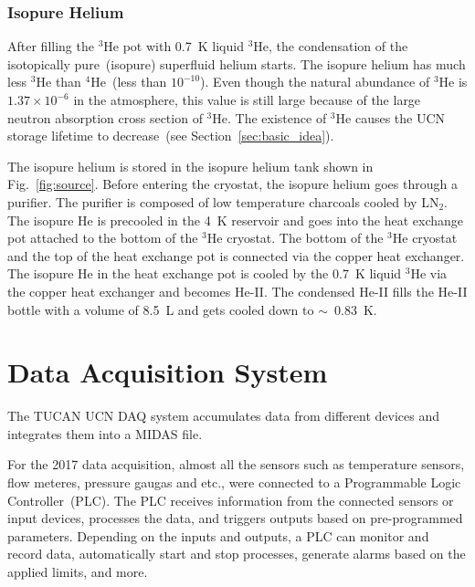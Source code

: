\subsubsection{Isopure Helium}
After filling the $^3$He pot with 0.7~K liquid $^3$He, the
condensation of the isotopically pure~(isopure) superfluid helium
starts. The isopure helium has much less $^3$He than $^4$He~(less than
$10^{-10}$).  Even though the natural abundance of $^3$He is
$1.37 \times 10^{-6}$ in the atmosphere, this value is still large
because of the large neutron absorption cross section of $^3$He. The
existence of $^3$He causes the UCN storage lifetime to decrease~(see
Section~\ref{sec:basic_idea}).

The isopure helium is stored in the isopure helium tank shown in
Fig.~\ref{fig:source}. Before entering the cryostat, the isopure
helium goes through a purifier. The purifier is composed of low
temperature charcoals cooled by LN$_2$.  The isopure He is precooled
in the 4~K reservoir and goes into the heat exchange pot attached to
the bottom of the $^3$He cryostat. The bottom of the $^3$He cryostat
and the top of the heat exchange pot is connected via the copper heat
exchanger. The isopure He in the heat exchange pot is cooled by the
0.7~K liquid $^3$He via the copper heat exchanger and becomes
He-II. The condensed He-II fills the He-II bottle with a volume of
8.5~L and gets cooled down to $\sim$~0.83~K.




\section{Data Acquisition System\label{sec:DAQ}}
The TUCAN UCN DAQ system accumulates data from different devices and
integrates them into a MIDAS file.

For the 2017 data acquisition, almost all the sensors such as
temperature sensors, flow meteres, pressure gaugas and etc., were
connected to a Programmable Logic Controller~(PLC). The PLC receives
information from the connected sensors or input devices, processes the
data, and triggers outputs based on pre-programmed parameters.
Depending on the inputs and outputs, a PLC can monitor and record
data, automatically start and stop processes, generate alarms based on
the applied limits, and more.


